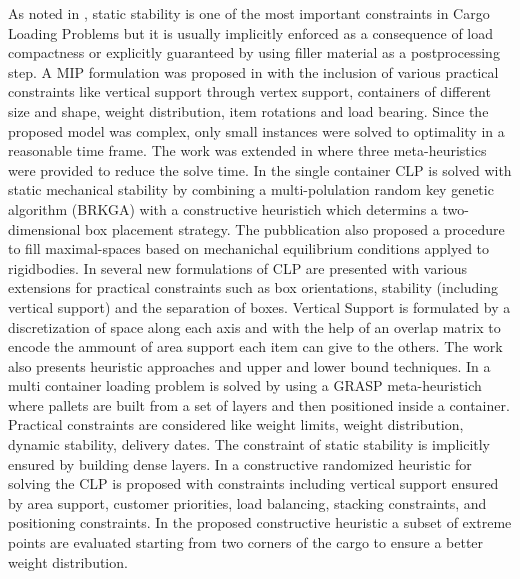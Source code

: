 As noted in \citep{BORTFELDT20131}, static stability is one of the most important constraints in Cargo Loading Problems but it is usually implicitly enforced as a consequence of load compactness or explicitly guaranteed by using filler material as a postprocessing step.
A MIP formulation was proposed in \citep{paquay2016mixed} with the inclusion of various practical constraints like vertical support through vertex support, containers of different size and shape, weight distribution, item rotations and load bearing.
Since the proposed model was complex, only small instances were solved to optimality in a reasonable time frame. The work was extended in \citep{paquay2007} where three meta-heuristics were provided to reduce the solve time.
In \citep{GALRAORAMOS2016565} the single container CLP is solved with static mechanical stability by combining a multi-polulation random key genetic algorithm (BRKGA) with a constructive heuristich which determins a two-dimensional box placement strategy.
The pubblication also proposed a procedure to fill maximal-spaces based on mechanichal equilibrium conditions applyed to rigidbodies.
In \citep{kurpel2020exact} several new formulations of CLP are presented with various extensions for practical constraints such as box orientations, stability (including vertical support) and the separation of boxes.
Vertical Support is formulated by a discretization of space along each axis and with the help of an overlap matrix to encode the ammount of area support each item can give to the others.
The work also presents heuristic approaches and upper and lower bound techniques.
In \citep{Alonso2020} a multi container loading problem is solved by using a GRASP meta-heuristich where pallets are built from a set of layers and then positioned inside a container. 
Practical constraints are considered like weight limits, weight distribution, dynamic stability, delivery dates. The constraint of static stability is implicitly ensured by building dense layers.
In \citep{GAJDA2022102559} a constructive randomized heuristic for solving the CLP is proposed with constraints including vertical support ensured by area support, customer priorities, load balancing, stacking constraints, and positioning constraints.
In the proposed constructive heuristic a subset of extreme points are evaluated starting from two corners of the cargo to ensure a better weight distribution.